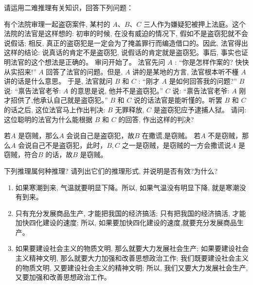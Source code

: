 \documentclass{ctexart}
\begin{document}
\begin{problem}\label{pro:4}
  请运用二难推理有关知识，回答下列问题：

  有个法院审理一起盗窃案件, 某村的 $A 、 B 、 C$ 三人作为嫌疑犯被押上法庭。这个法院的法官是这样想的: 初审的时候, 在没有威迫的情况下, 假如不是盗窃犯就不会说假话; 相反, 真正的盗窃犯是一定会为了掩盖罪行而编造借口的。因此, 法官得出这样的结论: 说真话的肯定不是盗窃犯, 说假话的肯定就是盗窃犯。事后, 事实也证明法官的这个想法是正确的。
  审问开始了。
  法官先问 $A$ :
  “你是怎样作案的? 快快从实招来!”
  $A$ 回答了法官的问题。但是, $A$ 讲的是某地的方言, 法官根本听不㯵 $A$讲的话是什么意思。
  于是, 法官就问 $B$ 和 $C$ :
  “刚才 $A$ 是如何回答我的问题?”
  $B$ 说: “禀告法官老爷: $A$ 的意思是说, 他并不是盗窃犯。”
  $C$ 说: “禀告法官老爷: $A$ 刚才招供了,他承认自己就是盗窃犯。”
  $B$ 和 $C$ 说的话法官是能听慬的。听罢 $B$ 和 $C$ 的话之后, 这位法官马上作出判决: $B$ 无罪释放, $C$ 是盗窃犯应予逮捕人狱。
  请问: 这位聪明的法官为什么能根据 $B$ 和 $C$ 的回答, 作出这样的判决?
\end{problem}
\begin{solution}
  若\(A\) 是窃贼，那么\(A\) 会说自己是盗窃犯，故\(B\) 在撒谎,是窃贼。
  若\(A\) 不是窃贼，那么\(A\) 会说自己不是盗窃犯，此时，\(B,C\) 之一是窃贼，是窃贼的一方会撒谎说\(A\) 是窃贼，符合\(B\) 的话，故\(B\) 是窃贼。
\end{solution}
\begin{problem}\label{pro:5}

  下列推理属何种推理? 请列出它们的推理形式, 并说明是否有效?为什么?
  \begin{enumerate}
    \item 如果寒潮到来, 气温就要明显下降。所以, 如果气温没有明显下降, 就是寒潮没有到来。
    \item 只有充分发展商品生产, 才能把我国的经济搞活; 只有把我国的经济搞活, 才能加快四化建设的速度; 所以, 如果要加快四化建设的速度,就要充分发展商品生产。
    \item 如果要建设社会主义的物质文明, 那么就要大力发展社会生产; 如果要建设社会主义精神文明, 那么就要大力加强和改善思想政治工作; 我们既要建设社会主义的物质文明, 又要建设社会主义的精神文明; 所以, 我们又要大力发展社会生产, 又要加强和改善思想政治工作。
  \end{enumerate}
\end{problem}
\end{document}
